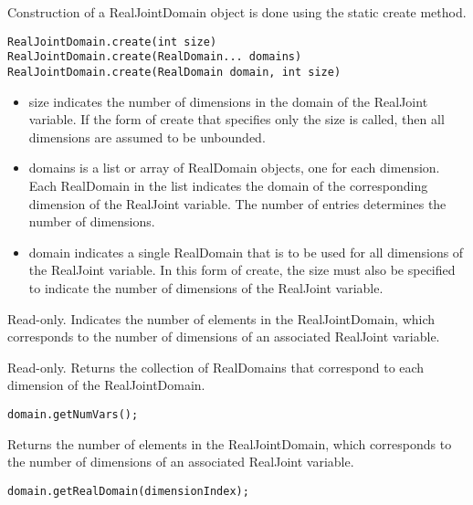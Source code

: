 \ifjava
Construction of a RealJointDomain object is done using the static create method.

\begin{lstlisting}
RealJointDomain.create(int size)
RealJointDomain.create(RealDomain... domains)
RealJointDomain.create(RealDomain domain, int size)
\end{lstlisting}

\begin{itemize}
\item size indicates the number of dimensions in the domain of the RealJoint variable.  If the form of create that specifies only the size is called, then all dimensions are assumed to be unbounded.
\item domains is a list or array of RealDomain objects, one for each dimension.  Each RealDomain in the list indicates the domain of the corresponding dimension of the RealJoint variable.  The number of entries determines the number of dimensions.
\item domain indicates a single RealDomain that is to be used for all dimensions of the RealJoint variable.  In this form of create, the size must also be specified to indicate the number of dimensions of the RealJoint variable.
\end{itemize}
\fi


\ifmatlab
{}

Read-only.  Indicates the number of elements in the RealJointDomain, which corresponds to the number of dimensions of an associated RealJoint variable.
\fi


Read-only.  Returns the collection of RealDomains that correspond to each dimension of the RealJointDomain.


\ifjava
{}


\begin{lstlisting}
domain.getNumVars();
\end{lstlisting}

Returns the number of elements in the RealJointDomain, which corresponds to the number of dimensions of an associated RealJoint variable.


\begin{lstlisting}
domain.getRealDomain(dimensionIndex);
\end{lstlisting}

